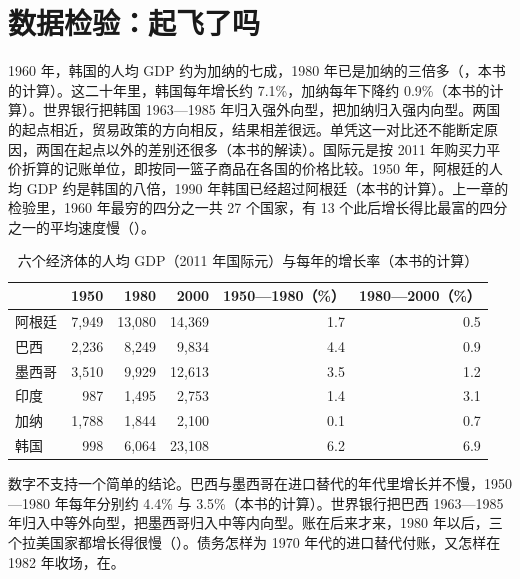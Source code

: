 \section{数据检验：起飞了吗}\label{sec:development-check}

1960 年，韩国的人均 GDP 约为加纳的七成，1980 年已是加纳的三倍多（，本书的计算）\cite{mpd2023,boltvanzanden2024,mpd41src}。这二十年里，韩国每年增长约 7.1\%，加纳每年下降约 0.9\%（本书的计算）。世界银行把韩国 1963—1985 年归入强外向型，把加纳归入强内向型\cite{wdr1987}。两国的起点相近，贸易政策的方向相反，结果相差很远。单凭这一对比还不能断定原因，两国在起点以外的差别还很多（本书的解读）。国际元是按 2011 年购买力平价折算的记账单位，即按同一篮子商品在各国的价格比较\cite{mpd2023}。1950 年，阿根廷的人均 GDP 约是韩国的八倍，1990 年韩国已经超过阿根廷（本书的计算）。上一章的检验里，1960 年最穷的四分之一共 27 个国家，有 13 个此后增长得比最富的四分之一的平均速度慢（）\cite{pwt1001}。

\begin{table}[tbp]
\centering\small
\caption{六个经济体的人均 GDP（2011 年国际元）与每年的增长率（本书的计算）}\label{tab:development-paths}
\begin{tabularx}{\linewidth}{@{}Y r r r r r@{}}
\toprule
 & 1950 & 1980 & 2000 & 1950—1980（\%） & 1980—2000（\%） \\
\midrule
阿根廷 & 7,949 & 13,080 & 14,369 & 1.7 & 0.5 \\
巴西 & 2,236 & 8,249 & 9,834 & 4.4 & 0.9 \\
墨西哥 & 3,510 & 9,929 & 12,613 & 3.5 & 1.2 \\
印度 & 987 & 1,495 & 2,753 & 1.4 & 3.1 \\
加纳 & 1,788 & 1,844 & 2,100 & 0.1 & 0.7 \\
韩国 & 998 & 6,064 & 23,108 & 6.2 & 6.9 \\
\bottomrule
\end{tabularx}
\end{table}

数字不支持一个简单的结论。巴西与墨西哥在进口替代的年代里增长并不慢，1950—1980 年每年分别约 4.4\% 与 3.5\%（本书的计算）。世界银行把巴西 1963—1985 年归入中等外向型，把墨西哥归入中等内向型\cite{wdr1987}。账在后来才来，1980 年以后，三个拉美国家都增长得很慢（）。债务怎样为 1970 年代的进口替代付账，又怎样在 1982 年收场，在。

